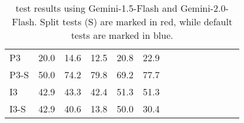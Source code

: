 \begin{table*}[h]
{\begin{tabular}{lccccccccccccc}
    \midrule
    \cellcolor{myblue!34.0} P3 & 20.0 & 14.6 & 12.5 & 20.8 & 22.9 \\
    \cellcolor{myred!34.0} P3-S & 50.0 & 74.2 & 79.8 & 69.2 & 77.7 \\
    \midrule
    \cellcolor{myblue!34.0} I3 & 42.9 & 43.3 & 42.4 & 51.3 & 51.3 \\
    \cellcolor{myred!34.0} I3-S & 42.9 & 40.6 & 13.8 & 50.0 & 30.4 \\
    \bottomrule
    \end{tabular}
    }
    \caption{{\methodname} test results using Gemini-1.5-Flash and Gemini-2.0-Flash. Split tests (S) are marked in \colorbox{myred!34}{red}, while default tests are marked in \colorbox{myblue!34}{blue}.}
    \label{tab:gemini-flash}
\end{table*}

\clearpage

